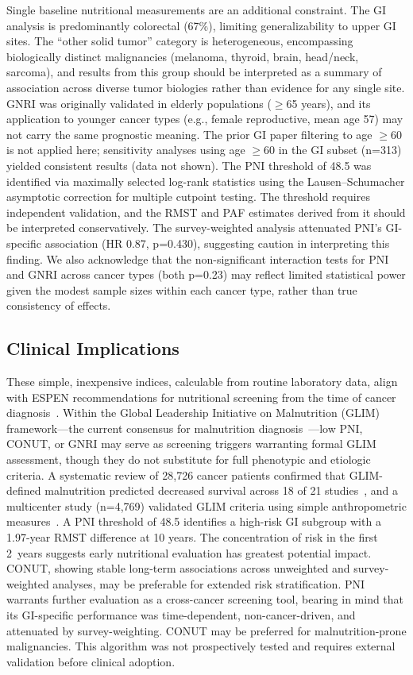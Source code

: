 \documentclass[review]{elsarticle}
\begin{document}
Single baseline nutritional measurements are an additional constraint. The GI analysis is predominantly colorectal (67\%), limiting generalizability to upper GI sites. The ``other solid tumor'' category is heterogeneous, encompassing biologically distinct malignancies (melanoma, thyroid, brain, head/neck, sarcoma), and results from this group should be interpreted as a summary of association across diverse tumor biologies rather than evidence for any single site. GNRI was originally validated in elderly populations ($\ge$65 years), and its application to younger cancer types (e.g., female reproductive, mean age 57) may not carry the same prognostic meaning. The prior GI paper filtering to age $\ge$60 is not applied here; sensitivity analyses using age $\ge$60 in the GI subset (n=313) yielded consistent results (data not shown). The PNI threshold of 48.5 was identified via maximally selected log-rank statistics using the Lausen--Schumacher asymptotic correction for multiple cutpoint testing. The threshold requires independent validation, and the RMST and PAF estimates derived from it should be interpreted conservatively. The survey-weighted analysis attenuated PNI's GI-specific association (HR 0.87, p=0.430), suggesting caution in interpreting this finding. We also acknowledge that the non-significant interaction tests for PNI and GNRI across cancer types (both p=0.23) may reflect limited statistical power given the modest sample sizes within each cancer type, rather than true consistency of effects.

\subsection{Clinical Implications}

These simple, inexpensive indices, calculable from routine laboratory data, align with ESPEN recommendations for nutritional screening from the time of cancer diagnosis~\cite{muscaritoli2021}. Within the Global Leadership Initiative on Malnutrition (GLIM) framework---the current consensus for malnutrition diagnosis~\cite{cederholm2019}---low PNI, CONUT, or GNRI may serve as screening triggers warranting formal GLIM assessment, though they do not substitute for full phenotypic and etiologic criteria. A systematic review of 28,726 cancer patients confirmed that GLIM-defined malnutrition predicted decreased survival across 18 of 21 studies~\cite{brown2023}, and a multicenter study (n=4,769) validated GLIM criteria using simple anthropometric measures~\cite{xie2024}. A PNI threshold of 48.5 identifies a high-risk GI subgroup with a 1.97-year RMST difference at 10 years. The concentration of risk in the first 2~years suggests early nutritional evaluation has greatest potential impact. CONUT, showing stable long-term associations across unweighted and survey-weighted analyses, may be preferable for extended risk stratification. PNI warrants further evaluation as a cross-cancer screening tool, bearing in mind that its GI-specific performance was time-dependent, non-cancer-driven, and attenuated by survey-weighting. CONUT may be preferred for malnutrition-prone malignancies. This algorithm was not prospectively tested and requires external validation before clinical adoption.
\end{document}
